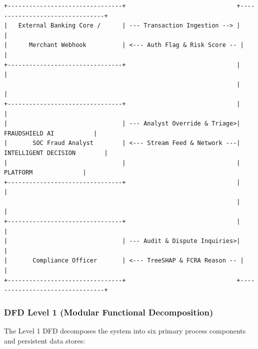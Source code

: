 \documentclass[12pt,a4paper,oneside]{report}
\begin{document}
\begin{lstlisting}
+--------------------------------+                               +--------------------------------+
|   External Banking Core /      | --- Transaction Ingestion --> |                                |
|      Merchant Webhook          | <--- Auth Flag & Risk Score -- |                                |
+--------------------------------+                               |                                |
                                                                 |                                |
+--------------------------------+                               |                                |
|                                | --- Analyst Override & Triage>|       FRAUDSHIELD AI           |
|       SOC Fraud Analyst        | <--- Stream Feed & Network ---|    INTELLIGENT DECISION        |
|                                |                               |          PLATFORM              |
+--------------------------------+                               |                                |
                                                                 |                                |
+--------------------------------+                               |                                |
|                                | --- Audit & Dispute Inquiries>|                                |
|       Compliance Officer       | <--- TreeSHAP & FCRA Reason -- |                                |
+--------------------------------+                               +--------------------------------+
\end{lstlisting}

\subsubsection{DFD Level 1 (Modular Functional Decomposition)}

The Level 1 DFD decomposes the system into six primary process components and persistent data stores:
\end{document}
